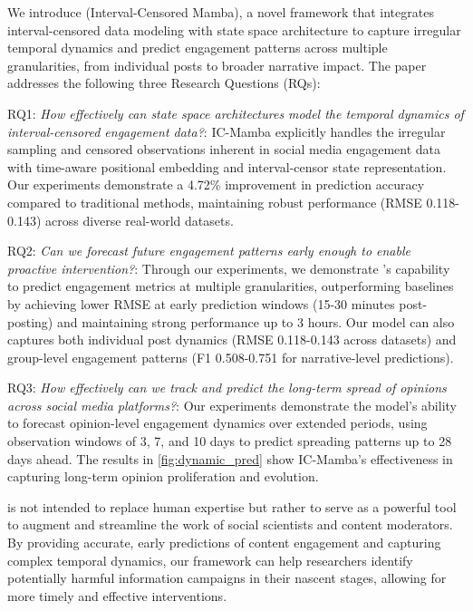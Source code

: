 

We introduce \icmamba (Interval-Censored Mamba), a novel framework that integrates interval-censored data modeling with state space architecture to capture irregular temporal dynamics and predict engagement patterns across multiple granularities, from individual posts to broader narrative impact.
The paper addresses the following three Research Questions (RQs):

RQ1: \textit{How effectively can state space architectures model the temporal dynamics of interval-censored engagement data?}: IC-Mamba explicitly handles the irregular sampling and censored observations inherent in social media engagement data with time-aware positional embedding and interval-censor state representation. Our experiments demonstrate a 4.72\% improvement in prediction accuracy compared to traditional methods, maintaining robust performance (RMSE 0.118-0.143) across diverse real-world datasets.

RQ2:\textit{ Can we forecast future engagement patterns early enough to enable proactive intervention?}: Through our experiments, we demonstrate \icmamba's capability to predict engagement metrics at multiple granularities, outperforming baselines by achieving lower RMSE at early prediction windows (15-30 minutes post-posting) and maintaining strong performance up to 3 hours. Our model can also captures both individual post dynamics (RMSE 0.118-0.143 across datasets) and group-level engagement patterns (F1 0.508-0.751 for narrative-level predictions).

RQ3: \textit{How effectively can we track and predict the long-term spread of opinions across social media platforms?}: Our experiments demonstrate the model's ability to forecast opinion-level engagement dynamics over extended periods, using observation windows of 3, 7, and 10 days to predict spreading patterns up to 28 days ahead. The results in \cref{fig:dynamic_pred} show IC-Mamba's effectiveness in capturing long-term opinion proliferation and evolution.

\icmamba is not intended to replace human expertise but rather to serve as a powerful tool to augment and streamline the work of social scientists and content moderators. By providing accurate, early predictions of content engagement and capturing complex temporal dynamics, our framework can help researchers identify potentially harmful information campaigns in their nascent stages, allowing for more timely and effective interventions.